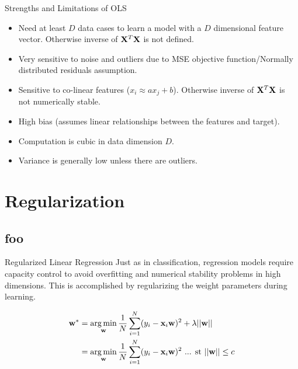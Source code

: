 \documentclass[serif,xcolor=pdftex,dvipsnames,table,hyperref={bookmarks=false,breaklinks}]{beamer}
\begin{document}
\begin{frame}[t]{Strengths and Limitations of OLS} 

\begin{itemize}
\item Need at least $D$ data cases to learn a model with a $D$
dimensional feature vector. \pause Otherwise inverse of
${\mathbf{X}}^T{\mathbf{X}}$ is not defined.

\pause\item Very sensitive to noise and outliers due to MSE objective 
function/Normally distributed residuals assumption.

\pause\item Sensitive to co-linear features ($x_i \approx ax_j +b$). \pause Otherwise inverse of
${\mathbf{X}}^T{\mathbf{X}}$ is not numerically stable.

\pause\item High bias (assumes linear relationships between the features and target).

\pause\item Computation is cubic in data dimension $D$.

\pause\item Variance is generally low unless there are outliers.


\end{itemize}

\end{frame}



\section{Regularization}
\subsection{foo}

\begin{frame}[t]{Regularized Linear Regression} 
Just as in classification, regression models require capacity control to avoid overfitting 
and numerical stability problems in high dimensions. This is accomplished by 
regularizing the weight parameters during learning.

\pause
\begin{align*}
{\mathbf{w}}^* &= \operatorname*{arg\,min}_{{\mathbf{w}}} \frac{1}{N}\sum_{i=1}^N(y_i - {\mathbf{x}}_i{\mathbf{w}})^2 + \lambda ||{\mathbf{w}}||\\
          &= \operatorname*{arg\,min}_{{\mathbf{w}}} \frac{1}{N}\sum_{i=1}^N(y_i - {\mathbf{x}}_i{\mathbf{w}})^2 
           \mbox{ ... st } ||{\mathbf{w}}|| \leq c
\end{align*}
\end{frame}
\end{document}
